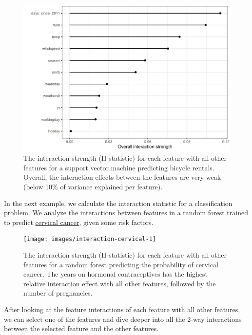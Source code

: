 \documentclass[12pt,]{krantz}
\begin{document}
\begin{figure}

{\centering \includegraphics[width=\textwidth]{images/interaction-bike-1} 

}

\caption{The interaction strength (H-statistic) for each feature with all other features for a support vector machine predicting bicycle rentals. Overall, the interaction effects between the features are very weak (below 10\% of variance explained per feature).}\label{fig:interaction-bike}
\end{figure}

In the next example, we calculate the interaction statistic for a
classification problem. We analyze the interactions between features in
a random forest trained to predict \protect\hyperlink{cervical}{cervical
cancer}, given some risk factors.

\begin{figure}

{\centering \texttt{[image: images/interaction-cervical-1]} 

}

\caption{The interaction strength (H-statistic) for each feature with all other features for a random forest predicting the probability of cervical cancer. The years on hormonal contraceptives has the highest relative interaction effect with all other features, followed by the number of pregnancies.}\label{fig:interaction-cervical-include}
\end{figure}

After looking at the feature interactions of each feature with all other
features, we can select one of the features and dive deeper into all the
2-way interactions between the selected feature and the other features.
\end{document}
